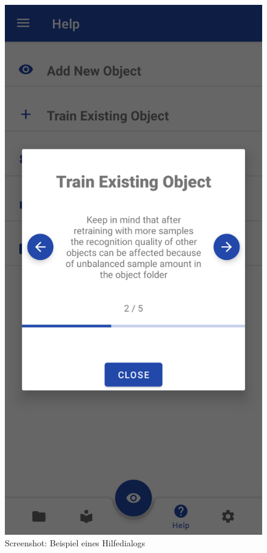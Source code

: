 \documentclass[oneside]{ausarbeitung}
\begin{document}
\begin{figure}[hptb]
	\centering
	\includegraphics[height=0.6\textheight]{images/screenshots/help-dialog.png}
	\caption{Screenshot: Beispiel eines Hilfedialogs}
	\label{fig:screenshot:help-dialog}
\end{figure}
\end{document}
